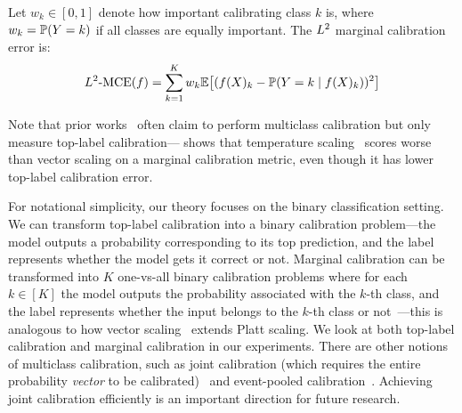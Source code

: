 \begin{definition}
\label{dfn:marginal-ce}
Let $w_k \in [0, 1]$ denote how important calibrating class $k$ is, where $w_k = \mathbb{P}(Y = k)$ if all classes are equally important. The $L^2$ marginal calibration error is:
\begin{align}
L^2\mbox{-MCE}(f) = \sum_{k = 1}^K w_k \mathbb{E}\big[ (f(X)_k - \mathbb{P}(Y = k \mid f(X)_k))^2 \big]
\end{align}
\end{definition}

Note that prior works~\cite{guo2017calibration, hendrycks2019anomaly, hendrycks2019pretraining} often claim to perform multiclass calibration but only measure top-label calibration---\cite{nixon2019calibration} shows that temperature scaling~\cite{guo2017calibration} scores worse than vector scaling on a marginal calibration metric, even though it has lower top-label calibration error.



For notational simplicity, our theory focuses on the binary classification setting. We can transform top-label calibration into a binary calibration problem---the model outputs a probability corresponding to its top prediction, and the label represents whether the model gets it correct or not. Marginal calibration can be transformed into $K$ one-vs-all binary calibration problems where for each $k \in [K]$ the model outputs the probability associated with the $k$-th class, and the label represents whether the input belongs to the $k$-th class or not~\cite{zadrozny2002transforming}---this is analogous to how vector scaling~\cite{guo2017calibration} extends Platt scaling. We look at both top-label calibration and marginal calibration in our experiments.
There are other notions of multiclass calibration, such as joint calibration (which requires the entire probability \emph{vector} to be calibrated)~\cite{murphy1973vector, brocker2009decomposition} and event-pooled calibration~\cite{kuleshov2015calibrated}. Achieving joint calibration efficiently is an important direction for future research.


